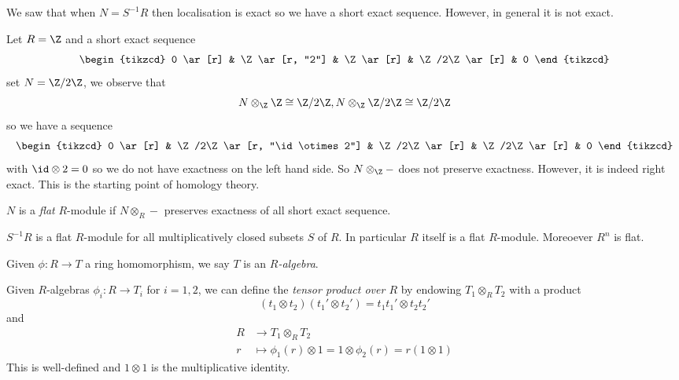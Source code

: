 \documentclass[a4paper]{article}
\begin{document}
We saw that when \(N = S^{-1}R\) then localisation is exact so we have a short exact sequence. However, in general it is not exact.

\begin{eg}
  Let \(R = \Z\) and a short exact sequence
  \[
    \begin{tikzcd}
      0 \ar[r] & \Z \ar[r, "2"] & \Z \ar[r] & \Z/2\Z \ar[r] & 0
    \end{tikzcd}
  \]
  set \(N = \Z/2\Z\), we observe that
  \[
    N \otimes_\Z \Z \cong \Z/2\Z, N \otimes_\Z \Z/2\Z \cong \Z/2\Z
  \]
  so we have a sequence
  \[
    \begin{tikzcd}
      0 \ar[r] & \Z/2\Z \ar[r, "\id \otimes 2"] & \Z/2\Z \ar[r] & \Z/2\Z \ar[r] & 0
    \end{tikzcd}
  \]
  with \(\id \otimes 2 = 0\) so we do not have exactness on the left hand side. So \(N \otimes_\Z -\) does not preserve exactness. However, it is indeed right exact. This is the starting point of homology theory.
\end{eg}

\begin{definition}
  \(N\) is a \emph{flat} \(R\)-module if \(N \otimes_R -\) preserves exactness of all short exact sequence.
\end{definition}

\begin{eg}
  \(S^{-1}R\) is a flat \(R\)-module for all multiplicatively closed subsets \(S\) of \(R\). In particular \(R\) itself is a flat \(R\)-module. Moreoever \(R^n\) is flat.
\end{eg}

\begin{definition}[algebra]
  Given \(\phi: R \to T\) a ring homomorphism, we say \(T\) is an \emph{\(R\)-algebra}.
\end{definition}

\begin{definition}
  Given \(R\)-algebras \(\phi_i: R \to T_i\) for \(i = 1, 2\), we can define the \emph{tensor product over \(R\)} by endowing \(T_1 \otimes_R T_2\) with a product
  \[
    (t_1 \otimes t_2) (t_1' \otimes t_2') = t_1t_1' \otimes t_2t_2'
  \]
  and
  \begin{align*}
    R &\to T_1 \otimes_R T_2 \\
    r &\mapsto \phi_1(r) \otimes 1 = 1 \otimes \phi_2(r) = r(1 \otimes 1)
  \end{align*}
  This is well-defined and \(1 \otimes 1\) is the multiplicative identity.
\end{definition}
\end{document}
